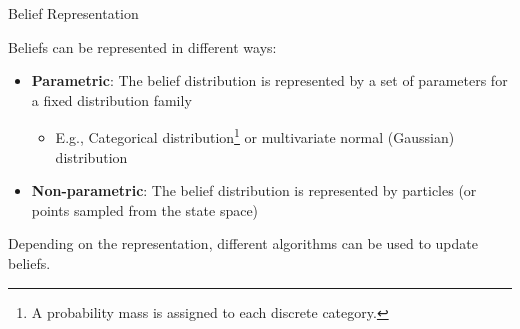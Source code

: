 \begin{frame}[fragile]{Belief Representation}

Beliefs can be represented in different ways:
\begin{itemize}
    \item \textbf{Parametric}: The belief distribution is represented by a set of parameters for a fixed distribution family
    \begin{itemize}
        \item E.g., Categorical distribution\footnote{A probability mass is assigned to each discrete category.} or multivariate normal (Gaussian) distribution
    \end{itemize}
    \item \textbf{Non-parametric}: The belief distribution is represented by particles (or points sampled from the state space)
\end{itemize}

\vspace{5mm}
Depending on the representation, different algorithms can be used to update beliefs.


\end{frame}